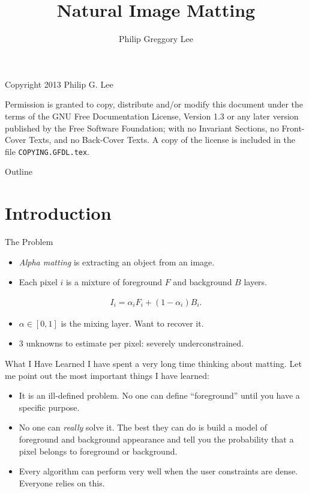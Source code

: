 \documentclass{beamer}
\title{Natural Image Matting}
\author{Philip Greggory Lee}
\institute{
 Electrical Engineering and Computer Science\\
 Northwestern University\\
 Evanston, IL 60208
}
\begin{document}
\begin{frame}
 \titlepage
\end{frame}

\begin{frame}{Copyright 2013 Philip G. Lee}
 \begin{center}
 Permission is granted to copy, distribute and/or modify this document
 under the terms of the GNU Free Documentation License, Version 1.3
 or any later version published by the Free Software Foundation;
 with no Invariant Sections, no Front-Cover Texts, and no Back-Cover Texts.
 A copy of the license is included in the file \texttt{COPYING.GFDL.tex}.
 \end{center}
\end{frame}

\begin{frame}{Outline}
 \tableofcontents
\end{frame}
\addtocounter{framenumber}{-1}

\section{Introduction}%

\begin{frame}{The Problem}
 \begin{itemize}
  \item \textit{Alpha matting} is extracting an object from an image.
  \item Each pixel $i$ is a mixture of foreground $F$ and background $B$ layers.
 \end{itemize}
 \begin{align}
   I_i = \alpha_i F_i + (1-\alpha_i)B_i.
 \end{align}
 \begin{itemize}
  \item $\alpha \in [0,1]$ is the mixing layer. Want to recover it.
  \item 3 unknowns to estimate per pixel: severely underconstrained.
 \end{itemize}
\end{frame}

\begin{frame}{What I Have Learned}
 I have spent a very long time thinking about matting. Let me point out the
 most important things I have learned:
 \begin{itemize}
  \item It is an ill-defined problem. No one can define ``foreground'' until
        you have a specific purpose.
  \item No one can \textit{really} solve it. The best they can do is build a
        model of foreground and background appearance and tell you the
        probability that a pixel belongs to foreground or background.
  \item Every algorithm can perform very well when the user constraints are
        dense. Everyone relies on this.
 \end{itemize}
\end{frame}
\end{document}
